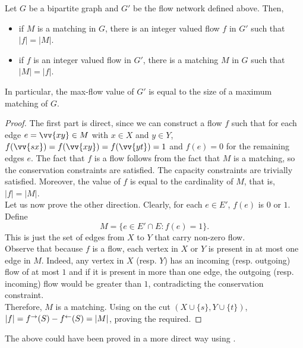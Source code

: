 \begin{lemma}
	Let $G$ be a bipartite graph and $G'$ be the flow network defined above. Then,
	\begin{itemize}
		\item if $M$ is a matching in $G$, there is an integer valued flow $f$ in $G'$ such that $|f|=|M|$.
		\item if $f$ is an integer valued flow in $G'$, there is a matching $M$ in $G$ such that $|M|=|f|$.
	\end{itemize}
	In particular, the max-flow value of $G'$ is equal to the size of a maximum matching of $G$.
\end{lemma}
\begin{proof}
	The first part is direct, since we can construct a flow $f$ such that for each edge $e = \vv{xy}\in M$ with $x\in X$ and $y\in Y$, $f(\vv{sx})=f(\vv{xy})=f(\vv{yt})=1$ and $f(e)=0$ for the remaining edges $e$. The fact that $f$ is a flow follows from the fact that $M$ is a matching, so the conservation constraints are satisfied. The capacity constraints are trivially satisfied. Moreover, the value of $f$ is equal to the cardinality of $M$, that is, $|f|=|M|$.\\

	Let us now prove the other direction. Clearly, for each $e\in E'$, $f(e)$ is $0$ or $1$. Define
	\[ M = \{e\in E'\cap E : f(e)=1\}. \]
	This is just the set of edges from $X$ to $Y$ that carry non-zero flow.\\
	Observe that because $f$ is a flow, each vertex in $X$ or $Y$ is present in at most one edge in $M$. Indeed, any vertex in $X$ (resp. $Y$) has an incoming (resp. outgoing) flow of at most $1$ and if it is present in more than one edge, the outgoing (resp. incoming) flow would be greater than $1$, contradicting the conservation constraint.\\
	Therefore, $M$ is a matching. Using  on the cut $(X\cup\{s\},Y\cup\{t\})$, $|f| = f^\to(S) - f^\leftarrow(S) = |M|$, proving the required.
\end{proof}

The above could have been proved in a more direct way using .